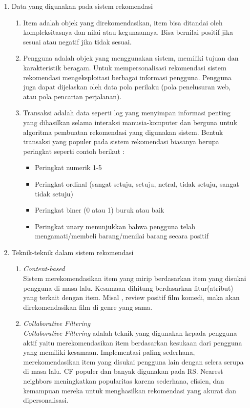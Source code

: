 \documentclass[a4paper,twoside]{article}
\begin{document}
\begin{enumerate}
\begin{enumerate}
			\item Data yang digunakan pada sistem rekomendasi
			\begin{enumerate}
			\item Item adalah objek yang direkomendasikan, item bisa ditandai oleh kompleksitasnya dan nilai atau kegunaannya. Bisa bernilai positif jika sesuai atau negatif jika tidak sesuai.
			\item Pengguna adalah objek yang menggunakan sistem, memiliki tujuan dan karakteristik beragam. Untuk mempersonalisasi rekomendasi sistem rekomendasi mengeksploitasi berbagai informasi pengguna. Pengguna juga dapat dijelaskan oleh data pola perilaku (pola penelusuran web, atau pola  pencarian perjalanan).
			\item Transaksi adalah data seperti log yang menyimpan informasi penting yang dihasilkan selama interaksi manusia-komputer dan berguna untuk algoritma pembuatan rekomendasi yang digunakan sistem. Bentuk transaksi yang populer pada sistem rekomendasi biasanya berupa peringkat seperti contoh berikut :
				\begin{itemize}
					\item Peringkat numerik 1-5
					\item Peringkat ordinal (sangat setuju, setuju, netral, tidak setuju, sangat tidak setuju)
					\item Peringkat biner (0 atau 1) buruk atau baik
					\item Peringkat unary menunjukkan bahwa pengguna telah mengamati/membeli barang/menilai barang secara positif
				\end{itemize}
			\end{enumerate}		 
			
			\item Teknik-teknik dalam sistem rekomendasi
				\begin{enumerate}
					\item \textit{Content-based}\\
						Sistem merekomendasikan item yang mirip berdasarkan item yang disukai pengguna di masa lalu. Kesamaan dihitung berdasarkan fitur(atribut) yang terkait dengan item. Misal , review positif film komedi, maka akan direkomendasikan film di genre yang sama. 

					\item \textit{Collaborative Filtering} \\
						\textit{Collaborative Filtering} adalah teknik yang digunakan kepada pengguna aktif yaitu merekomendasikan item berdasarkan kesukaan dari pengguna yang memiliki kesamaan. Implementasi paling sederhana, merekomendasikan item yang disukai pengguna lain dengan selera serupa di masa lalu. CF populer dan banyak digunakan pada RS. Nearest neighbors meningkatkan popularitas karena sederhana, efisien, dan kemampuan mereka untuk menghasilkan rekomendasi yang akurat dan dipersonalisasi.
	

\end{enumerate}
\end{enumerate}
\end{enumerate}
\end{document}
